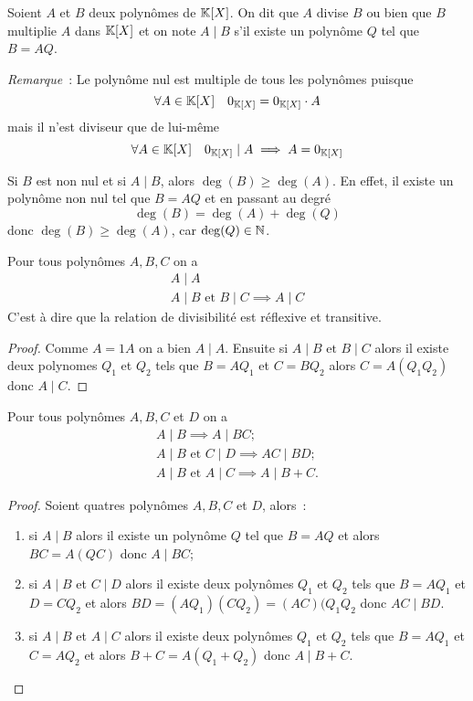 \begin{defdef}
  Soient $A$ et $B$ deux polynômes de $\mathbb{K}[X]$. On dit que $A$ divise $B$ ou bien que $B$ multiplie $A$ dans $\mathbb{K}[X]$ et on note $A\mid{}B$ s'il existe un polynôme $Q$ tel que $B=AQ$.
\end{defdef}

\emph{Remarque}~: Le polynôme nul est multiple de tous les polynômes puisque
\begin{equation}
  \forall A \in \mathbb{K}[X] \quad 0_{\mathbb{K}[X]} = 0_{\mathbb{K}[X]} \cdot A
\end{equation}
mais il n'est diviseur que de lui-même
\begin{equation}
  \forall A \in \mathbb{K}[X] \quad 0_{\mathbb{K}[X]}\mid{}A \implies A=0_{\mathbb{K}[X]}
\end{equation}

Si $B$ est non nul et si $A\mid{}B$, alors $\deg(B) \geq \deg(A)$. En effet, il existe un polynôme non nul tel que $B=AQ$ et en passant au degré
\begin{equation}
  \deg(B) = \deg(A)+\deg(Q)
\end{equation}
donc $\deg(B) \geq \deg(A)$, car $\deg(Q)\in \mathbb{N}$.

\begin{prop}
  Pour tous polynômes $A,B,C$ on a
  \begin{align}
    A\mid{}A \\
    A\mid{}B \text{~et~} B\mid{}C \implies A\mid{}C
  \end{align}
C'est à dire que la relation de divisibilité est réflexive et transitive.
\end{prop}
\begin{proof}
  Comme $A=1 A$ on a bien $A\mid{}A$. Ensuite si $A\mid{}B \text{~et~} B\mid{}C$ alors il existe deux polynomes $Q_1$ et $Q_2$ tels que $B=AQ_1$ et $C=BQ_2$ alors $C=A(Q_1Q_2)$ donc $A\mid{}C$.
\end{proof}

\begin{prop}
  Pour tous polynômes $A,B,C$ et $D$ on a
  \begin{gather}
    A\mid{}B \implies A\mid{}BC ;\\
    A\mid{}B \text{~et~} C\mid{}D \implies AC\mid{}BD ;\\
    A\mid{}B \text{~et~} A\mid{}C \implies A\mid{}B+C.
  \end{gather}
\end{prop}
\begin{proof} Soient quatres polynômes $A,B,C$ et $D$, alors~:
  \begin{enumerate}
  \item si $A\mid{}B$ alors il existe un polynôme $Q$ tel que $B=AQ$ et alors $BC=A(QC)$ donc $A\mid{}BC$;
  \item si $A\mid{}B$ et $C\mid{}D$ alors il existe deux polynômes $Q_1$ et $Q_2$ tels que $B=AQ_1$ et $D=CQ_2$ et alors $BD = (AQ_1)(CQ_2)=(AC)(Q_1Q_2$ donc $AC\mid{}BD$.
  \item si $A\mid{}B$ et $A\mid{}C$ alors il existe deux polynômes $Q_1$ et $Q_2$ tels que $B=AQ_1$ et $C=AQ_2$ et alors $B+C = A(Q_1+Q_2)$ donc $A\mid{}B+C$.
  \end{enumerate}
\end{proof}

